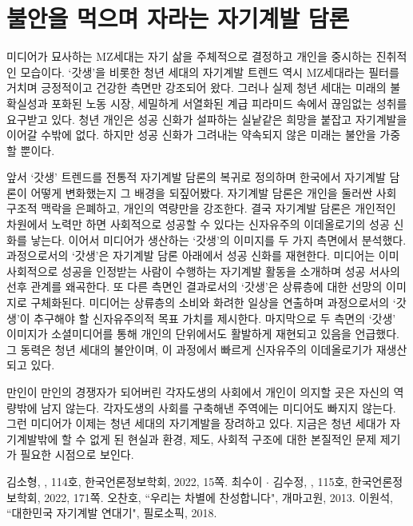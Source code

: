 \section*{불안을 먹으며 자라는 자기계발 담론}

미디어가 묘사하는 MZ세대는 자기 삶을 주체적으로 결정하고 개인을 중시하는 진취적인 모습이다. `갓생'을 비롯한 청년 세대의 자기계발 트렌드 역시 MZ세대라는 필터를 거치며 긍정적이고 건강한 측면만 강조되어 왔다. 그러나 실제 청년 세대는 미래의 불확실성과 포화된 노동 시장, 세밀하게 서열화된 계급 피라미드 속에서 끊임없는 성취를 요구받고 있다. 청년 개인은 성공 신화가 설파하는 실낱같은 희망을 붙잡고 자기계발을 이어갈 수밖에 없다. 하지만 성공 신화가 그려내는 약속되지 않은 미래는 불안을 가중할 뿐이다.

앞서 `갓생' 트렌드를 전통적 자기계발 담론의 복귀로 정의하며 한국에서 자기계발 담론이 어떻게 변화했는지 그 배경을 되짚어봤다. 자기계발 담론은 개인을 둘러싼 사회 구조적 맥락을 은폐하고, 개인의 역량만을 강조한다. 결국 자기계발 담론은 개인적인 차원에서 노력만 하면 사회적으로 성공할 수 있다는 신자유주의 이데올로기의 성공 신화를 낳는다. 이어서 미디어가 생산하는 `갓생'의 이미지를 두 가지 측면에서 분석했다. 과정으로서의 `갓생'은 자기계발 담론 아래에서 성공 신화를 재현한다. 미디어는 이미 사회적으로 성공을 인정받는 사람이 수행하는 자기계발 활동을 소개하며 성공 서사의 선후 관계를 왜곡한다. 또 다른 측면인 결과로서의 `갓생'은 상류층에 대한 선망의 이미지로 구체화된다. 미디어는 상류층의 소비와 화려한 일상을 연출하며 과정으로서의 `갓생'이 추구해야 할 신자유주의적 목표 가치를 제시한다. 마지막으로 두 측면의 `갓생' 이미지가 소셜미디어를 통해 개인의 단위에서도 활발하게 재현되고 있음을 언급했다. 그 동력은 청년 세대의 불안이며, 이 과정에서 빠르게 신자유주의 이데올로기가 재생산되고 있다.

만인이 만인의 경쟁자가 되어버린 각자도생의 사회에서 개인이 의지할 곳은 자신의 역량밖에 남지 않는다. 각자도생의 사회를 구축해낸 주역에는 미디어도 빠지지 않는다. 그런 미디어가 이제는 청년 세대의 자기계발을 장려하고 있다. 지금은 청년 세대가 자기계발밖에 할 수 없게 된 현실과 환경, 제도, 사회적 구조에 대한 본질적인 문제 제기가 필요한 시점으로 보인다.

\begin{thebibliography}{9}
   김소형, ,  114호, 한국언론정보학회, 2022, 15쪽.
   최수이 $\cdot$ 김수정, ,  115호, 한국언론정보학회, 2022, 171쪽.
   오찬호, ``우리는 차별에 찬성합니다", 개마고원, 2013.
   이원석, ``대한민국 자기계발 연대기", 필로소픽, 2018.
\end{thebibliography}

